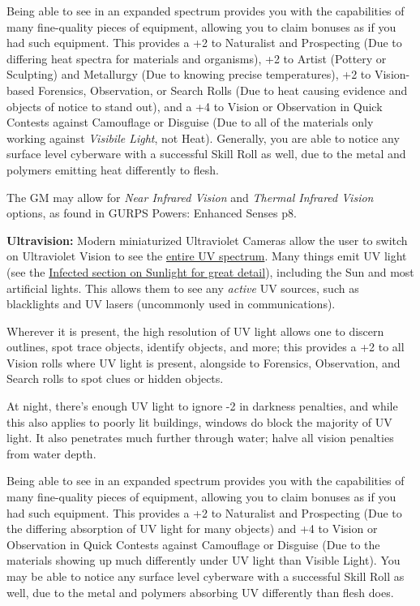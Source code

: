 \begin{multicols*}{3}
	Being able to see in an expanded spectrum provides you with the capabilities of many fine-quality pieces of equipment, allowing you to claim bonuses as if you had such equipment. This provides a +2 to Naturalist and Prospecting (Due to differing heat spectra for materials and organisms), +2 to Artist (Pottery or Sculpting) and Metallurgy (Due to knowing precise temperatures), +2 to Vision-based Forensics, Observation, or Search Rolls (Due to heat causing evidence and objects of notice to stand out), and a +4 to Vision or Observation in Quick Contests against Camouflage or Disguise (Due to all of the materials only working against \textit{Visibile Light}, not Heat). Generally, you are able to notice any surface level cyberware with a successful Skill Roll as well, due to the metal and polymers emitting heat differently to flesh.
	
	The GM may allow for \textit{Near Infrared Vision} and \textit{Thermal Infrared Vision} options, as found in GURPS Powers: Enhanced Senses p8.
	
	\textbf{Ultravision:} Modern miniaturized Ultraviolet Cameras allow the user to switch on Ultraviolet Vision to see the \textcolor{Blue}{\href{https://en.wikipedia.org/wiki/Ultraviolet}{entire UV spectrum}}. Many things emit UV light (see the \hyperref[sunlight]{Infected section on Sunlight for great detail}), including the Sun and most artificial lights. This allows them to see any \textit{active} UV sources, such as blacklights and UV lasers (uncommonly used in communications).
	
	Wherever it is present, the high resolution of UV light allows one to discern outlines, spot trace objects, identify objects, and more; this provides a +2 to all Vision rolls where UV light is present, alongside to Forensics, Observation, and Search rolls to spot clues or hidden objects.
	
	At night, there's enough UV light to ignore -2 in darkness penalties, and while this also applies to poorly lit buildings, windows do block the majority of UV light. It also penetrates much further through water; halve all vision penalties from water depth.
	
	Being able to see in an expanded spectrum provides you with the capabilities of many fine-quality pieces of equipment, allowing you to claim bonuses as if you had such equipment. This provides a +2 to Naturalist and Prospecting (Due to the differing absorption of UV light for many objects) and +4 to Vision or Observation in Quick Contests against Camouflage or Disguise (Due to the materials showing up much differently under UV light than Visible Light). You may be able to notice any surface level cyberware with a successful Skill Roll as well, due to the metal and polymers absorbing UV differently than flesh does.
	

\end{multicols*}
